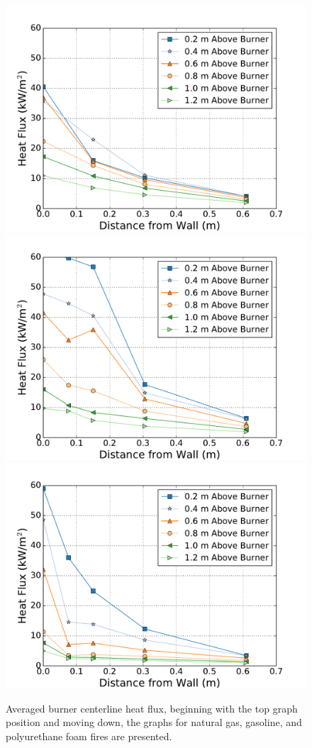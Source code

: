 \documentclass[twoside]{uocthesis}
\begin{document}
 \begin{figure}[p]
	\centering
	\includegraphics[width=.625\columnwidth]{../Figures/IWGB_NG_HF_Center_Avg}\\
	\includegraphics[width=.625\columnwidth]{../Figures/IWGB_GAS_HF_Center_Avg}\\
	\includegraphics[width=.625\columnwidth]{../Figures/IWGB_PUF_HF_Center_Avg}\\
	\caption[Averaged burner centerline heat flux for the natural gas, gasoline, and foam fires]{Averaged burner centerline heat flux, beginning with the top graph position and moving down, the graphs for natural gas, gasoline, and polyurethane foam fires are presented.}
	\label{IWGB_HF_Comp_Center}
\end{figure}
\end{document}
